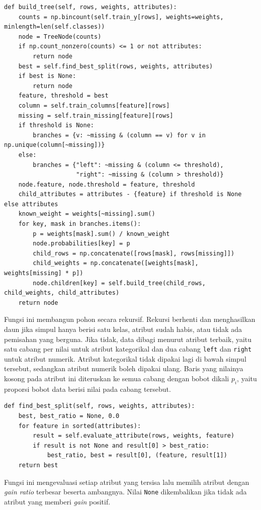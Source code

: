 \begin{lstlisting}
def build_tree(self, rows, weights, attributes):
    counts = np.bincount(self.train_y[rows], weights=weights, minlength=len(self.classes))
    node = TreeNode(counts)
    if np.count_nonzero(counts) <= 1 or not attributes:
        return node
    best = self.find_best_split(rows, weights, attributes)
    if best is None:
        return node
    feature, threshold = best
    column = self.train_columns[feature][rows]
    missing = self.train_missing[feature][rows]
    if threshold is None:
        branches = {v: ~missing & (column == v) for v in np.unique(column[~missing])}
    else:
        branches = {"left": ~missing & (column <= threshold),
                    "right": ~missing & (column > threshold)}
    node.feature, node.threshold = feature, threshold
    child_attributes = attributes - {feature} if threshold is None else attributes
    known_weight = weights[~missing].sum()
    for key, mask in branches.items():
        p = weights[mask].sum() / known_weight
        node.probabilities[key] = p
        child_rows = np.concatenate([rows[mask], rows[missing]])
        child_weights = np.concatenate([weights[mask], weights[missing] * p])
        node.children[key] = self.build_tree(child_rows, child_weights, child_attributes)
    return node
\end{lstlisting}

Fungsi ini membangun pohon secara rekursif. Rekursi berhenti dan menghasilkan
daun jika simpul hanya berisi satu kelas, atribut sudah habis, atau tidak ada
pemisahan yang berguna. Jika tidak, data dibagi menurut atribut terbaik, yaitu
satu cabang per nilai untuk atribut kategorikal dan dua cabang \texttt{left}
dan \texttt{right} untuk atribut numerik. Atribut kategorikal tidak dipakai lagi
di bawah simpul tersebut, sedangkan atribut numerik boleh dipakai ulang.
Baris yang nilainya kosong pada atribut ini diteruskan ke semua cabang dengan
bobot dikali $p_i$, yaitu proporsi bobot data berisi nilai pada cabang
tersebut.

\begin{lstlisting}
def find_best_split(self, rows, weights, attributes):
    best, best_ratio = None, 0.0
    for feature in sorted(attributes):
        result = self.evaluate_attribute(rows, weights, feature)
        if result is not None and result[0] > best_ratio:
            best_ratio, best = result[0], (feature, result[1])
    return best
\end{lstlisting}

Fungsi ini mengevaluasi setiap atribut yang tersisa lalu memilih atribut dengan
\textit{gain ratio} terbesar beserta ambangnya. Nilai \texttt{None} dikembalikan
jika tidak ada atribut yang memberi \textit{gain} positif.

